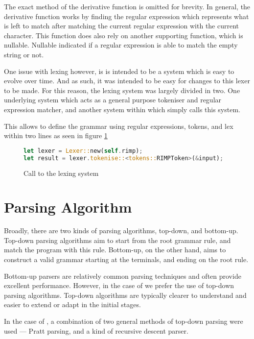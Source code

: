 The exact method of the derivative function is omitted for brevity. In general, the derivative function works by finding the regular expression which represents what is left to match after matching the current regular expression with the current character. This function does also rely on another supporting function, which is nullable. Nullable indicated if a regular expression is able to match the empty string or not.

One issue with lexing however, is \rimp is intended to be a system which is easy to evolve over time. And as such, it was intended to be easy for changes to this lexer to be made.
For this reason, the lexing system was largely divided in two. One underlying system which acts as a general purpose tokeniser and regular expression matcher, and another system within \rimp which simply calls this system.

This allows \rimp to define the grammar using regular expressions, tokens, and lex within two lines as seen in figure \ref{fig:lexing_system} 

\begin{figure}[h]
    \centering
    \begin{lstlisting}[language=Rust,label={lst:derivative}]
let lexer = Lexer::new(self.rimp);
let result = lexer.tokenise::<tokens::RIMPToken>(&input);
    \end{lstlisting}
    \caption{Call to the lexing system}
    \label{fig:lexing_system}
\end{figure}


\section{Parsing Algorithm}

Broadly, there are two kinds of parsing algorithms, top-down, and bottom-up. Top-down parsing algorithms aim to start from the root grammar rule, and match the program with this rule. Bottom-up, on the other hand, aims to construct a valid grammar starting at the terminals, and ending on the root rule.

Bottom-up parsers are relatively common parsing techniques and often provide excellent performance. However, in the case of \rimp we prefer the use of top-down parsing algorithms. Top-down algorithms are typically clearer to understand and easier to extend or adapt in the initial stages. 


In the case of \rimp, a combination of two general methods of top-down parsing were used — Pratt parsing, and a kind of recursive descent parser.

